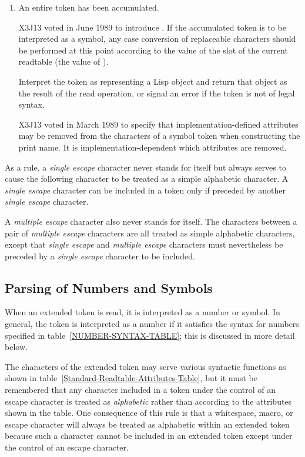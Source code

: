 \begin{enumerate}
\item
An entire token has been accumulated.
\begin{newer}
X3J13 voted in June 1989  to introduce
.  If the accumulated token
is to be interpreted as a symbol, any case conversion of replaceable
characters should be performed at this point according to the value
of the  slot of the current readtable (the value
of ).
\end{newer}
Interpret the token as representing
a Lisp object and return that object as the result
of the read operation, or signal an error if the token
is not of legal syntax.
\begin{newer}
X3J13 voted in March 1989 
to specify that implementation-defined
attributes may be removed from the characters of a symbol token
when constructing the print name.
It is implementation-dependent which attributes are removed.
\end{newer}
\label{READER-TOKEN-END}
\end{enumerate}
\endgroup

As a rule, a \emph{single escape} character never stands for itself but always
serves to cause the following character to be treated as a simple alphabetic
character.  A \emph{single escape} character can be included in a token only
if preceded by another \emph{single escape} character.

A \emph{multiple escape} character also never stands for itself.  The characters
between a pair of \emph{multiple escape} characters are all treated as
simple alphabetic characters, except that \emph{single escape} and
\emph{multiple escape} characters must nevertheless be preceded by
a \emph{single escape} character to be included.

\subsection{Parsing of Numbers and Symbols}
\label{PARSE-TOKENS-SECTION}

When an extended token is read, it is interpreted as a number or symbol.
In general, the token is interpreted as a number if it satisfies
the syntax for numbers specified in table~\ref{NUMBER-SYNTAX-TABLE};
this is discussed in more detail below.

The characters of the extended token may serve various syntactic
functions as shown
in table~\ref{Standard-Readtable-Attributes-Table}, but it must be
remembered that any character included in a token under the control
of an escape character is treated as \emph{alphabetic} rather than
according to the attributes shown in the table.
One consequence of this rule is that a whitespace, macro, or escape
character will always be treated as alphabetic within an extended token
because such a character cannot be included in an extended
token except under the control of an escape character.

